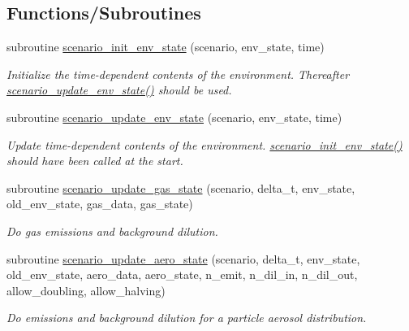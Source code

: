 \subsection*{Functions/\+Subroutines}
\begin{DoxyCompactItemize}
\item 
subroutine \mbox{\hyperlink{namespacepmc__scenario_a9ba2febb35bfe14fe1ce49994de7fdb9}{scenario\+\_\+init\+\_\+env\+\_\+state}} (scenario, env\+\_\+state, time)
\begin{DoxyCompactList}\small\item\em Initialize the time-\/dependent contents of the environment. Thereafter \mbox{\hyperlink{namespacepmc__scenario_a88ccdf6c90762496ecbb93e45cc92bb7}{scenario\+\_\+update\+\_\+env\+\_\+state()}} should be used. \end{DoxyCompactList}\item 
subroutine \mbox{\hyperlink{namespacepmc__scenario_a88ccdf6c90762496ecbb93e45cc92bb7}{scenario\+\_\+update\+\_\+env\+\_\+state}} (scenario, env\+\_\+state, time)
\begin{DoxyCompactList}\small\item\em Update time-\/dependent contents of the environment. \mbox{\hyperlink{namespacepmc__scenario_a9ba2febb35bfe14fe1ce49994de7fdb9}{scenario\+\_\+init\+\_\+env\+\_\+state()}} should have been called at the start. \end{DoxyCompactList}\item 
subroutine \mbox{\hyperlink{namespacepmc__scenario_a8da20291ae6441134e5f1788a906e96b}{scenario\+\_\+update\+\_\+gas\+\_\+state}} (scenario, delta\+\_\+t, env\+\_\+state, old\+\_\+env\+\_\+state, gas\+\_\+data, gas\+\_\+state)
\begin{DoxyCompactList}\small\item\em Do gas emissions and background dilution. \end{DoxyCompactList}\item 
subroutine \mbox{\hyperlink{namespacepmc__scenario_a6d0621141b705a051b14761430d385ca}{scenario\+\_\+update\+\_\+aero\+\_\+state}} (scenario, delta\+\_\+t, env\+\_\+state, old\+\_\+env\+\_\+state, aero\+\_\+data, aero\+\_\+state, n\+\_\+emit, n\+\_\+dil\+\_\+in, n\+\_\+dil\+\_\+out, allow\+\_\+doubling, allow\+\_\+halving)
\begin{DoxyCompactList}\small\item\em Do emissions and background dilution for a particle aerosol distribution. \end{DoxyCompactList}\item 

\end{DoxyCompactItemize}
